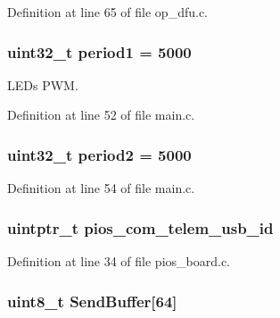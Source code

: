 \-Definition at line 65 of file op\-\_\-dfu.\-c.

\hypertarget{group___pip_xtreme_b_l_gabe751b3d399e053031c1e3db20b6b071}{
\subsubsection[{period1}]{\setlength{\rightskip}{0pt plus 5cm}uint32\-\_\-t {\bf period1} = 5000}}\label{group___pip_xtreme_b_l_gabe751b3d399e053031c1e3db20b6b071}


\-L\-E\-Ds \-P\-W\-M. 



\-Definition at line 52 of file main.\-c.

\hypertarget{group___pip_xtreme_b_l_gadf8633b43922fbf4f1d86981daf74ccc}{
\subsubsection[{period2}]{\setlength{\rightskip}{0pt plus 5cm}uint32\-\_\-t {\bf period2} = 5000}}\label{group___pip_xtreme_b_l_gadf8633b43922fbf4f1d86981daf74ccc}


\-Definition at line 54 of file main.\-c.

\hypertarget{group___pip_xtreme_b_l_ga513cc36d72b76de2fcb75ff233a79a4a}{
\subsubsection[{pios\-\_\-com\-\_\-telem\-\_\-usb\-\_\-id}]{\setlength{\rightskip}{0pt plus 5cm}uintptr\-\_\-t {\bf pios\-\_\-com\-\_\-telem\-\_\-usb\-\_\-id}}}\label{group___pip_xtreme_b_l_ga513cc36d72b76de2fcb75ff233a79a4a}


\-Definition at line 34 of file pios\-\_\-board.\-c.

\hypertarget{group___pip_xtreme_b_l_ga8f7836468d53f1bf54ab28474ae14624}{
\subsubsection[{\-Send\-Buffer}]{\setlength{\rightskip}{0pt plus 5cm}uint8\-\_\-t {\bf \-Send\-Buffer}\mbox{[}64\mbox{]}}}\label{group___pip_xtreme_b_l_ga8f7836468d53f1bf54ab28474ae14624}


